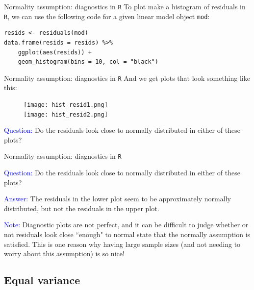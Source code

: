 \documentclass[10pt,t]{beamer}
\begin{document}
\begin{frame}[fragile]{Normality assumption: diagnostics in \texttt{R}}
To plot make a histogram of residuals in \texttt{R}, we can use the following code for a given linear model object \texttt{mod}:

\vspace{0.3cm}

\begin{lstlisting}
resids <- residuals(mod)
data.frame(resids = resids) %>%
    ggplot(aes(resids)) +
    geom_histogram(bins = 10, col = "black")
\end{lstlisting}

\end{frame}

\begin{frame}{Normality assumption: diagnostics in \texttt{R}}
And we get plots that look something like this:

	
\begin{figure}
	\centering 
	\texttt{[image: hist\_resid1.png]} \\
    \texttt{[image: hist\_resid2.png]}
\end{figure}

\textcolor{blue}{Question:} Do the residuals look close to normally distributed in either of these plots?

\end{frame}

\begin{frame}{Normality assumption: diagnostics in \texttt{R}}

\textcolor{blue}{Question:} Do the residuals look close to normally distributed in either of these plots?

\vspace{0.3cm}

\textcolor{blue}{Answer:} The residuals in the lower plot seem to be approximately normally distributed, but not the residuals in the upper plot.

\vspace{0.3cm}

\textcolor{blue}{Note:} Diagnostic plots are not perfect, and it can be difficult to judge whether or not residuals look close ``enough" to normal state that the normally assumption is satisfied. This is one reason why having large sample sizes (and not needing to worry about this assumption) is so nice!

\end{frame}

\subsection{Equal variance}
\end{document}
